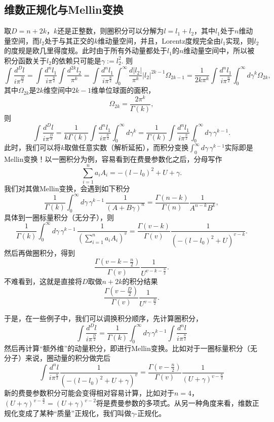 \documentclass[12pt]{article}
\theoremstyle{definition}
\theoremstyle{plain}
\begin{document}
\subsection{维数正规化与Mellin变换}

取$D=n+2k$，$k$还是正整数，则圈积分可以分解为$l=l_1+l_2$，其中$l_1$处于$n$维动量空间，而$l_2$处于与其正交的$k$维动量空间，并且，Lorentz度规完全由$l_1$实现，则$l_2$的度规是欧几里得度规。此时由于所有外动量都处于$l_1$的$n$维动量空间中，所以被积分函数关于$l_2$的依赖只可能是$\gamma:=l_2^2$. 则
\[
	\int \frac{d^{D} l}{i \pi^{\frac{D}{2}}}=\int \frac{d^{n} l_1}{i \pi^{\frac{n}{2}}}\int \frac{d^{2k} l_2}{\pi^{k}}=\int \frac{d^{n} l_1}{i \pi^{\frac{n}{2}}}\int_0^\infty \frac{d |l_2|}{\pi^{k}} |l_2|^{2k-1} \Omega_{2k-1}=\frac{1}{2k \pi^k}\int \frac{d^{n} l_1}{i \pi^{\frac{n}{2}}}\int_0^\infty d\gamma^k \Omega_{2k},
\]
其中$\Omega_{2k}$是$2k$维空间中$2k-1$维单位球面的面积，
\[
	\Omega_{2k}=\frac{2\pi^k}{\Gamma(k)},
\]
则
\[
	\int \frac{d^{D} l}{i \pi^{\frac{D}{2}}}=\frac{1}{k\Gamma(k)}\int \frac{d^{n} l_1}{i \pi^{\frac{n}{2}}}\int_0^\infty d\gamma^k=\frac{1}{\Gamma(k)}\int \frac{d^{n} l_1}{i \pi^{\frac{n}{2}}}\int_0^\infty d\gamma\, \gamma^{k-1}.
\]
此时，我们可以将$k$取做任意实数（解析延拓），而积分变换$\int_0^\infty d\gamma\, \gamma^{k-1}$实际即是Mellin变换！以一圈积分为例，容易看到在费曼参数化之后，分母写作
\[
	\sum_{i=1}^n a_iA_i= -(l-l_0)^2+U+\gamma.
\]
我们对其做Mellin变换，会遇到如下积分
\[
	\frac{1}{\Gamma(k)}\int_0^\infty d\gamma \, \gamma^{k-1}\, \frac{1}{(A+B\gamma)^n}=\frac{\Gamma(n-k)}{\Gamma(n)}\frac{1}{A^{n-k}B^k},
\]
具体到一圈标量积分（无分子），则
\[
	\frac{1}{\Gamma(k)}\int_0^\infty d\gamma \, \gamma^{k-1}\, \frac{1}{(\sum_{i=1}^n a_iA_i)^v}=\frac{\Gamma(v-k)}{\Gamma(v)}\frac{1}{(-(l-l_0)^2+U)^{v-k}}.
\]
然后再做圈积分，得到
\[
	\frac{\Gamma\left(v-k-\frac{n}{2}\right)}{\Gamma(v)}\frac{1}{U^{v-k-\frac{n}{2}}}.
\]
不难看到，这就是直接将$D$取做$n+2k$的积分结果
\[
	\frac{\Gamma\left(v-\frac{D}{2}\right)}{\Gamma(v)} \frac{1}{U^{v-\frac{D}{2}}}.
\]

于是，在一些例子中，我们可以调换积分顺序，先计算圈积分，
\[
	\int \frac{d^{D} l}{i \pi^{\frac{D}{2}}}=\frac{1}{\Gamma(k)}\int_0^\infty d\gamma\, \gamma^{k-1}\int \frac{d^{n} l}{i \pi^{\frac{n}{2}}}
\]
然后再计算“额外维”的动量积分，即进行Mellin变换。比如对于一圈标量积分（无分子）来说，圈动量的积分做完后
\[
	\int \frac{d^{n} l}{i \pi^{\frac{n}{2}}} \frac{1}{(-(l-l_0)^2+U+\gamma)^v}
	=\frac{\Gamma\left(v-\frac{n}{2}\right)}{\Gamma(v)} \frac{1}{(U+\gamma)^{v-\frac{n}{2}}}
\]
新的费曼参数积分可能会变得相对容易计算，比如对于$n=4$，$(U+\gamma)^{v-\frac{n}{2}}=(U+\gamma)^{v-2}$将是费曼参数的多项式。从另一种角度来看，维数正规化变成了某种“质量”正规化，我们叫做$\gamma$-正规化。
\end{document}

